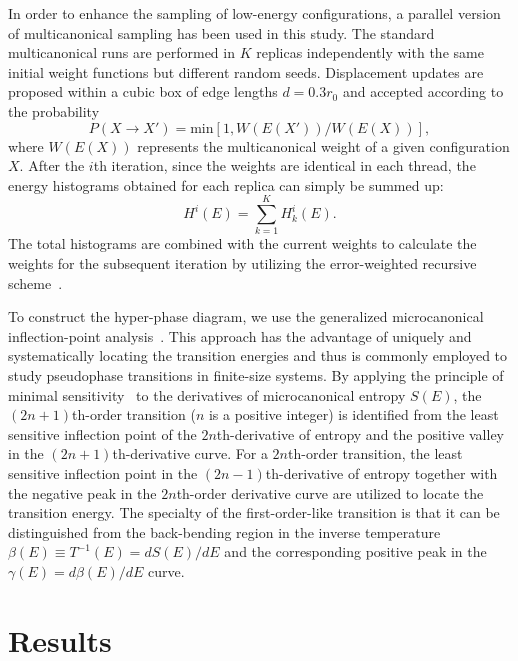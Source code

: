 \documentclass[12pt]{report}
\begin{document}
\newpage
In order to enhance the sampling of low-energy configurations, a parallel version of multicanonical sampling \cite{muca1,muca2,Zierenberg2013} has been used in this study. The standard multicanonical runs are performed in $K$ replicas independently with the same initial weight functions but different random seeds. Displacement updates are proposed within a cubic box of edge lengths $d=0.3r_0$ and accepted according to the probability
%
\begin{equation}
P(X \rightarrow X')= \mathrm{min}[1,W(E(X'))/W(E(X))],
\end{equation}
%
where $W(E(X))$ represents the multicanonical weight of a given configuration $X$. After the $i$th iteration, since the weights are identical in each thread, the energy histograms obtained for each replica can simply be summed up:
%
\begin{equation}
    H^i(E)=\sum^K_{k=1}H^i_k(E). 
\end{equation}
%
The total histograms are combined with the current weights to calculate the weights for the subsequent iteration by utilizing the error-weighted recursive
scheme~\cite{Bachmann2014,muca1,muca2}. 
%

To construct the hyper-phase diagram, we use the
generalized microcanonical inflection-point
analysis~\cite{Bachmann2014,Schnabel2011}. This approach has
the advantage of uniquely and systematically locating the transition
energies and thus is commonly employed to study pseudophase transitions
in finite-size systems. By applying the principle of minimal
sensitivity~\cite{Stevenson1981} to the derivatives of microcanonical
entropy $S(E)$, the $(2n+1)$th-order 
transition ($n$ is a positive integer) is identified from the
least sensitive inflection point of the $2n$th-derivative of entropy and
the positive valley in the $(2n+1)$th-derivative curve. For a
$2n$th-order transition, the least sensitive inflection point in the
$(2n-1)$th-derivative of entropy together with the negative peak in the
$2n$th-order derivative curve are utilized to locate the transition
energy. The specialty of the first-order-like transition is that it can
be distinguished from the back-bending region in the inverse temperature
$\beta(E)\equiv T^{-1}(E)=d S(E)/d E$ and the corresponding positive
peak in the $\gamma(E)=d \beta(E) / d E$ curve. 
%
\section{Results}
%
\end{document}
